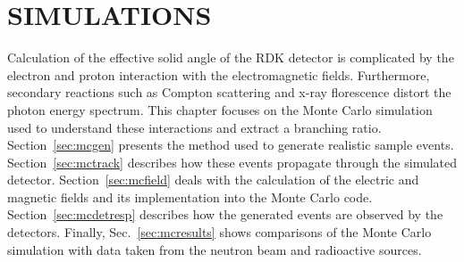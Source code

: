 \documentclass[oneside,12pt]{memoir}
\begin{document}
\chapter{SIMULATIONS}
\label{ch:mc}
Calculation of the effective solid angle of the RDK detector is complicated by the electron and proton interaction with the electromagnetic fields. Furthermore, secondary reactions such as Compton scattering and x-ray florescence distort the photon energy spectrum. This chapter focuses on the Monte Carlo simulation used to understand these interactions and extract a branching ratio. Section~\ref{sec:mcgen} presents the method used to generate realistic sample events. Section~\ref{sec:mctrack} describes how these events propagate through the simulated detector. Section~\ref{sec:mcfield} deals with the calculation of the electric and magnetic fields and its implementation into the Monte Carlo code. Section~\ref{sec:mcdetresp} describes how the generated events are observed by the detectors. Finally, Sec.~\ref{sec:mcresults} shows comparisons of the Monte Carlo simulation with data taken from the neutron beam and radioactive sources.
\end{document}
